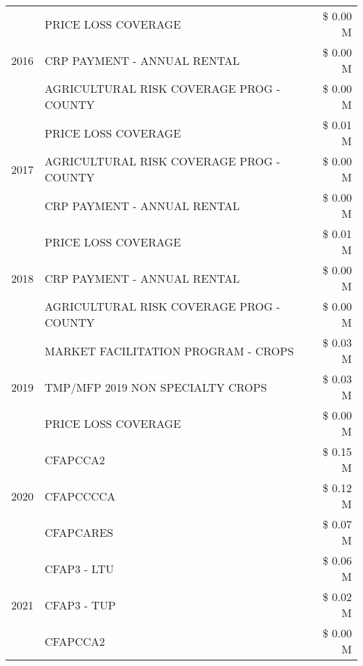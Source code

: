 \begin{tabular}{llr}
\cline{1-3}
\multirow[t]{3}{*}{2016} & PRICE LOSS COVERAGE & \$ 0.00 M \\
 & CRP PAYMENT - ANNUAL RENTAL & \$ 0.00 M \\
 & AGRICULTURAL RISK COVERAGE PROG - COUNTY & \$ 0.00 M \\
\cline{1-3}
\multirow[t]{3}{*}{2017} & PRICE LOSS COVERAGE & \$ 0.01 M \\
 & AGRICULTURAL RISK COVERAGE PROG - COUNTY & \$ 0.00 M \\
 & CRP PAYMENT - ANNUAL RENTAL & \$ 0.00 M \\
\cline{1-3}
\multirow[t]{3}{*}{2018} & PRICE LOSS COVERAGE & \$ 0.01 M \\
 & CRP PAYMENT - ANNUAL RENTAL & \$ 0.00 M \\
 & AGRICULTURAL RISK COVERAGE PROG - COUNTY & \$ 0.00 M \\
\cline{1-3}
\multirow[t]{3}{*}{2019} & MARKET FACILITATION PROGRAM - CROPS & \$ 0.03 M \\
 & TMP/MFP 2019 NON SPECIALTY CROPS & \$ 0.03 M \\
 & PRICE LOSS COVERAGE & \$ 0.00 M \\
\cline{1-3}
\multirow[t]{3}{*}{2020} & CFAPCCA2 & \$ 0.15 M \\
 & CFAPCCCCA & \$ 0.12 M \\
 & CFAPCARES & \$ 0.07 M \\
\cline{1-3}
\multirow[t]{3}{*}{2021} & CFAP3 - LTU & \$ 0.06 M \\
 & CFAP3 - TUP & \$ 0.02 M \\
 & CFAPCCA2 & \$ 0.00 M \\
\cline{1-3}
\bottomrule
\end{tabular}
